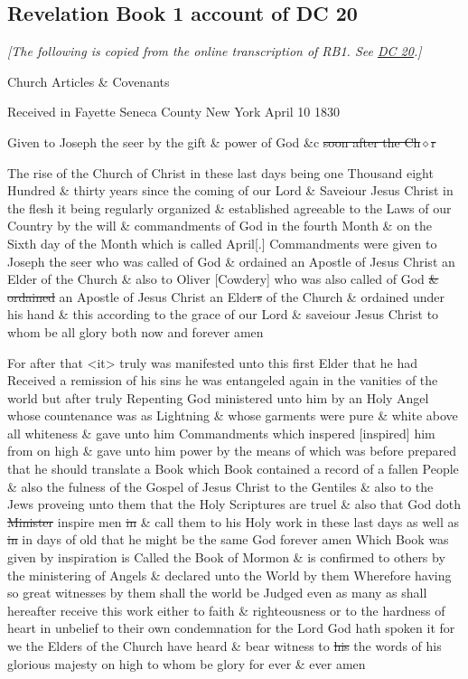 	\subsection{Revelation Book 1 account of DC 20}
		\label{EXSS-DC20-RB1}
		
		\textit{[The following is copied from the online transcription of RB1. See \hyperref[DC20]{DC 20}.]}
		
		Church Articles \& Covenants

		Received in Fayette Seneca County New York April 10 1830

		Given to Joseph the seer by the gift \& power of God \&c \sout{soon after the Ch$\diamond$r}

		The rise of the Church of Christ in these last days being one Thousand eight Hundred \& thirty years since the coming of our Lord \& Saveiour Jesus Christ in the flesh it being regularly organized \& established agreeable to the Laws of our Country by the will \& commandments of God in the fourth Month \& on the Sixth day of the Month which is called April[.] Commandments were given to Joseph the seer who was called of God \& ordained an Apostle of Jesus Christ an Elder of the Church \& also to Oliver [Cowdery] who was also called of God \sout{\& ordained} an Apostle of Jesus Christ an Elder\sout{s} of the Church \& ordained under his hand \& this according to the grace of our Lord \& saveiour Jesus Christ to whom be all glory both now and forever amen

		For after that <it> truly was manifested unto this first Elder that he had Received a remission of his sins he was entangeled again in the vanities of the world but after truly Repenting God ministered unto him by an Holy Angel whose countenance was as Lightning \& whose garments were pure \& white above all whiteness \& gave unto him Commandments which inspered [inspired] him from on high \& gave unto him power by the means of which was before prepared that he should translate a Book which Book contained a record of a fallen People \& also the fulness of the Gospel of Jesus Christ to the Gentiles \& also to the Jews proveing unto them that the Holy Scriptures are truel \& also that God doth \sout{Minister} inspire men \sout{in} \& call them to his Holy work in these last days as well as \sout{in} in days of old that he might be the same God forever amen Which Book was given by inspiration is Called the Book of Mormon \& is confirmed to others by the ministering of Angels \& declared unto the World by them Wherefore having so great witnesses by them shall the world be Judged even as many as shall hereafter receive this work either to faith \& righteousness or to the hardness of heart in unbelief to their own condemnation for the Lord God hath spoken it for we the Elders of the Church have heard \& bear witness to \sout{his} the words of his glorious majesty on high to whom be glory for ever \& ever amen

